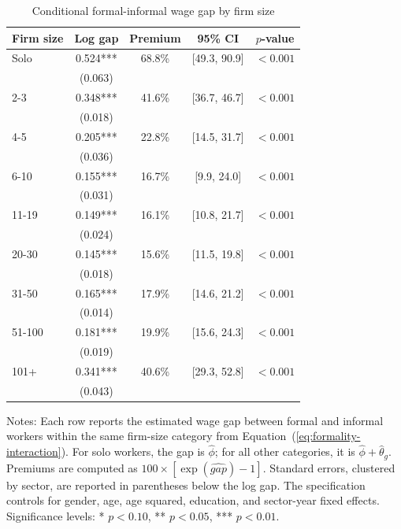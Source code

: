\begin{table}[htbp]
  \centering
  \caption{Conditional formal-informal wage gap by firm size}
  \label{tab:formal-wage-gap-by-size}
  \small
  \begin{tabular}{lcccc}
    \toprule
    Firm size & Log gap & Premium & 95\% CI & $p$-value \\
    \midrule
    Solo & 0.524*** & 68.8\% & [49.3, 90.9] & $<0.001$ \\
     & (0.063) &  &  &  \\
    2-3 & 0.348*** & 41.6\% & [36.7, 46.7] & $<0.001$ \\
     & (0.018) &  &  &  \\
    4-5 & 0.205*** & 22.8\% & [14.5, 31.7] & $<0.001$ \\
     & (0.036) &  &  &  \\
    6-10 & 0.155*** & 16.7\% & [9.9, 24.0] & $<0.001$ \\
     & (0.031) &  &  &  \\
    11-19 & 0.149*** & 16.1\% & [10.8, 21.7] & $<0.001$ \\
     & (0.024) &  &  &  \\
    20-30 & 0.145*** & 15.6\% & [11.5, 19.8] & $<0.001$ \\
     & (0.018) &  &  &  \\
    31-50 & 0.165*** & 17.9\% & [14.6, 21.2] & $<0.001$ \\
     & (0.014) &  &  &  \\
    51-100 & 0.181*** & 19.9\% & [15.6, 24.3] & $<0.001$ \\
     & (0.019) &  &  &  \\
    101+ & 0.341*** & 40.6\% & [29.3, 52.8] & $<0.001$ \\
     & (0.043) &  &  &  \\
    \bottomrule
  \end{tabular}
  \vspace{0.3em}
  \begin{minipage}{0.92\textwidth}
  \footnotesize
  Notes: Each row reports the estimated wage gap between formal and informal workers within the same firm-size category from Equation~(\ref{eq:formality-interaction}). For solo workers, the gap is $\hat{\phi}$; for all other categories, it is $\hat{\phi}+\hat{\theta}_g$. Premiums are computed as $100\times[\exp(\widehat{gap})-1]$. Standard errors, clustered by sector, are reported in parentheses below the log gap. The specification controls for gender, age, age squared, education, and sector-year fixed effects. Significance levels: * $p<0.10$, ** $p<0.05$, *** $p<0.01$.
  \end{minipage}
\end{table}
